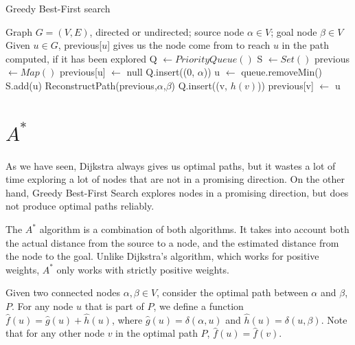 \documentclass[12pt]{report}
\newtheorem{definition}[theorem]{Definition}
\begin{document}
\begin{algorithm}
\caption{Greedy Best-First search}
\label{alg:greedy}
\begin{algorithmic}[1]
\Require Graph $G = (V, E)$, directed or undirected; source node $\alpha \in V$; goal node $\beta \in V$
\Ensure Given $u \in G$, previous[$u$] gives us the node come from to reach $u$ in the path computed, if it has been explored
\State Q $\gets PriorityQueue()$
\State S $\gets Set()$
\State previous $\gets Map()$
	\State previous[u] $\gets$ null
\EndFor
\State Q.insert((0, $\alpha$))
	\State u $\gets$ queue.removeMin()
	\State S.add(u)
	 
		\State \Return ReconstructPath(previous,$\alpha$,$\beta$)
	\EndIf
			\Continue
		\EndIf
		\State Q.insert((v, $h(v)$))
		\State previous[v] $\gets$ u
	\EndFor
\EndWhile
\EndProcedure
\end{algorithmic}
\end{algorithm}



\section{$A^*$}
As we have seen, Dijkstra always gives us optimal paths, but it wastes a lot of time exploring a lot of nodes that are not in a promising direction. On the other hand, Greedy Best-First Search explores nodes in a promising direction, but does not produce optimal paths reliably.

The $A^*$ algorithm is a combination of both algorithms. It takes into account both the actual distance from the source to a node, and the estimated distance from the node to the goal. Unlike Dijkstra's algorithm, which works for positive weights, $A^*$ only works with strictly positive weights.

Given two connected nodes $\alpha, \beta \in V$, consider the optimal path between $\alpha$ and $\beta$, $P$. For any node $u$ that is part of $P$, we define a function $\hat{f}(u) = \hat{g}(u) + \hat{h}(u)$, where $\hat{g}(u) = \delta(\alpha, u)$ and $\hat{h}(u) = \delta(u, \beta)$. Note that for any other node $v$ in the optimal path $P$, $\hat{f}(u) = \hat{f}(v)$.
\end{document}
